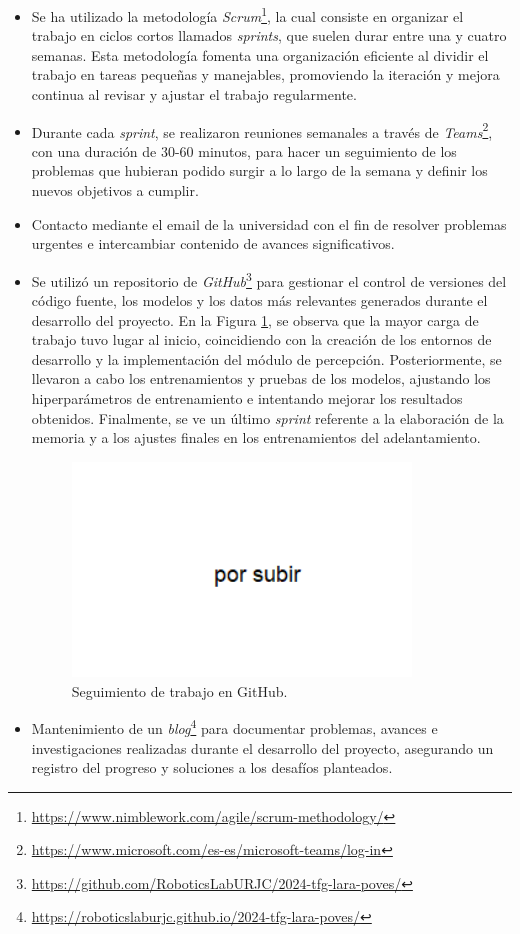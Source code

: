 \begin{itemize}
\item Se ha utilizado la metodología \textit{Scrum}\footnote{\url{https://www.nimblework.com/agile/scrum-methodology/}}, la cual consiste en organizar el trabajo en ciclos cortos llamados \textit{sprints}, que suelen durar entre una y cuatro semanas. Esta metodología fomenta una organización eficiente al dividir el trabajo en tareas pequeñas y manejables, promoviendo la iteración y mejora continua al revisar y ajustar el trabajo regularmente.
\item Durante cada \textit{sprint}, se realizaron reuniones semanales a través de \textit{Teams}\footnote{\url{https://www.microsoft.com/es-es/microsoft-teams/log-in}}, con una duración de 30-60 minutos, para hacer un seguimiento de los problemas que hubieran podido surgir a lo largo de la semana y definir los nuevos objetivos a cumplir.
\item Contacto mediante el email de la universidad con el fin de resolver problemas urgentes e intercambiar contenido de avances significativos.
\item Se utilizó un repositorio de \textit{GitHub}\footnote{\url{https://github.com/RoboticsLabURJC/2024-tfg-lara-poves/}} para gestionar el control de versiones del código fuente, los modelos y los datos más relevantes generados durante el desarrollo del proyecto. En la Figura \ref{fig:github}, se observa que la mayor carga de trabajo tuvo lugar al inicio, coincidiendo con la creación de los entornos de desarrollo y la implementación del módulo de percepción. Posteriormente, se llevaron a cabo los entrenamientos y pruebas de los modelos, ajustando los hiperparámetros de entrenamiento e intentando mejorar los resultados obtenidos. Finalmente, se ve un último \textit{sprint} referente a la elaboración de la memoria y a los ajustes finales en los entrenamientos del adelantamiento.

\begin{figure}[ht]
\centering
\includegraphics[width=9cm]{figs/objetivos/github.png}
\caption{Seguimiento de trabajo en GitHub.}
\label{fig:github}
\end{figure}

\item Mantenimiento de un \textit{blog}\footnote{\url{https://roboticslaburjc.github.io/2024-tfg-lara-poves/}} para documentar problemas, avances e investigaciones realizadas durante el desarrollo del proyecto, asegurando un registro del progreso y soluciones a los desafíos planteados.

\end{itemize}

